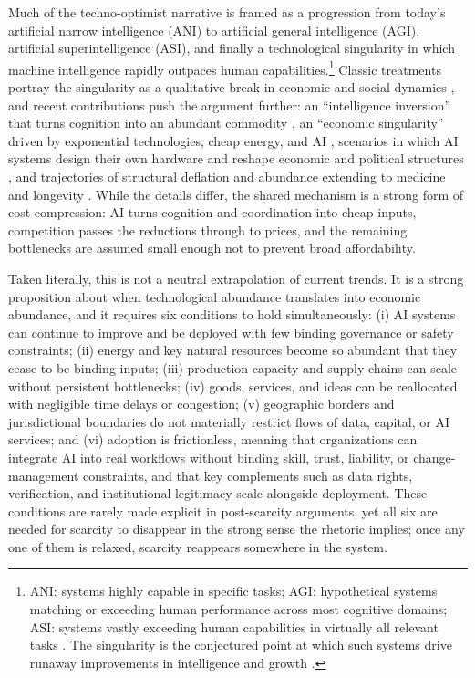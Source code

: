 \documentclass[11pt]{article}
\begin{document}
Much of the techno-optimist narrative is framed as a progression from today's artificial narrow intelligence (ANI) to artificial general intelligence (AGI), artificial superintelligence (ASI), and finally a technological singularity in which machine intelligence rapidly outpaces human capabilities.\footnote{ANI: systems highly capable in specific tasks; AGI: hypothetical systems matching or exceeding human performance across most cognitive domains; ASI: systems vastly exceeding human capabilities in virtually all relevant tasks \citep{Bostrom2014}. The singularity is the conjectured point at which such systems drive runaway improvements in intelligence and growth \citep{Vinge1993}.} Classic treatments portray the singularity as a qualitative break in economic and social dynamics \citep{Kurzweil2005, Bostrom2014}, and recent contributions push the argument further: an ``intelligence inversion'' that turns cognition into an abundant commodity \citep{Mostaque2025}, an ``economic singularity'' driven by exponential technologies, cheap energy, and AI \citep{PalBittel2024}, scenarios in which AI systems design their own hardware and reshape economic and political structures \citep{Tegmark2017}, and trajectories of structural deflation and abundance extending to medicine and longevity \citep{DiamandisKotler2012, Booth2020, Diamandis2025LongevityGuidebook}. While the details differ, the shared mechanism is a strong form of cost compression: AI turns cognition and coordination into cheap inputs, competition passes the reductions through to prices, and the remaining bottlenecks are assumed small enough not to prevent broad affordability.

Taken literally, this is not a neutral extrapolation of current trends. It is a strong proposition about when technological abundance translates into economic abundance, and it requires six conditions to hold simultaneously: (i) AI systems can continue to improve and be deployed with few binding governance or safety constraints; (ii) energy and key natural resources become so abundant that they cease to be binding inputs; (iii) production capacity and supply chains can scale without persistent bottlenecks; (iv) goods, services, and ideas can be reallocated with negligible time delays or congestion; (v) geographic borders and jurisdictional boundaries do not materially restrict flows of data, capital, or AI services; and (vi) adoption is frictionless, meaning that organizations can integrate AI into real workflows without binding skill, trust, liability, or change-management constraints, and that key complements such as data rights, verification, and institutional legitimacy scale alongside deployment. These conditions are rarely made explicit in post-scarcity arguments, yet all six are needed for scarcity to disappear in the strong sense the rhetoric implies; once any one of them is relaxed, scarcity reappears somewhere in the system.
\end{document}
